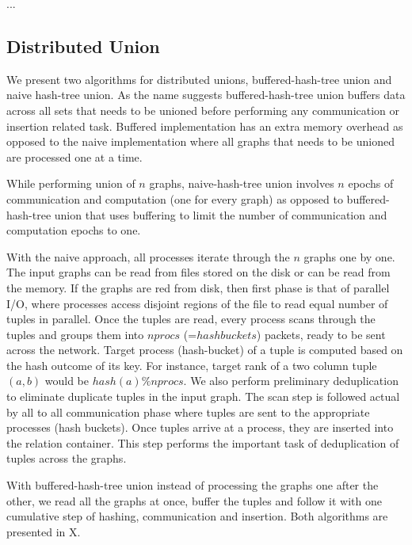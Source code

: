 ...


\subsection{Distributed Union}
We present two algorithms for distributed unions, buffered-hash-tree union and naive hash-tree union. As the name suggests buffered-hash-tree union buffers data across all sets that needs to be unioned before performing any communication or insertion related task. Buffered implementation has an extra memory overhead as opposed to the naive implementation where all graphs that needs to be unioned are processed one at a time.

While performing union of $n$ graphs, naive-hash-tree union involves $n$ epochs of communication and computation (one for every graph) as opposed to buffered-hash-tree union that uses buffering to limit the number of communication and computation epochs to one. 

With the naive approach, all processes iterate through the $n$ graphs one by one.
The input graphs can be read from files stored on the disk or can be read from the memory. If the graphs are red from disk, then first phase is that of parallel I/O, where processes access disjoint regions of the file to read equal number of tuples in parallel. Once the tuples are read, every process scans through the tuples and groups them into $nprocs$ (=$hashbuckets$) packets, ready to be sent across the network.
Target process (hash-bucket) of a tuple is computed based on the hash outcome of its key. For instance, target rank of a two column tuple $(a, b)$ would be $hash(a)\%nprocs$. We also perform preliminary deduplication to eliminate duplicate tuples in the input graph. The scan step is followed actual by all to all communication phase where tuples are sent to the appropriate processes (hash buckets). Once tuples arrive at a process, they are inserted into the relation container. This step performs the important task of deduplication of tuples across the graphs. 

With buffered-hash-tree union instead of processing the graphs one after the other, we read all the graphs at once, buffer the tuples and follow it with one cumulative step of hashing, communication and insertion. Both algorithms are presented in X.
